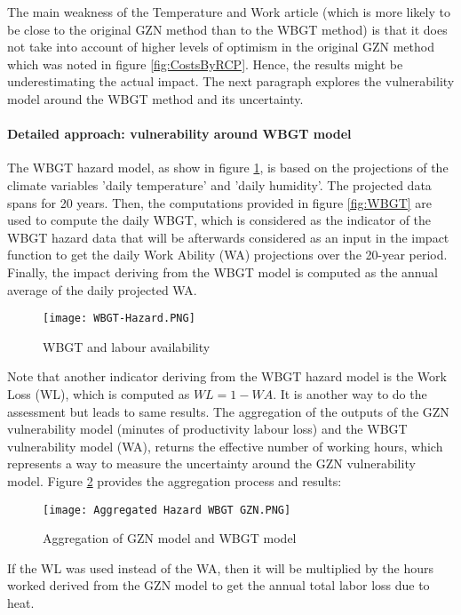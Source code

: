 \documentclass{article}
\begin{document}
The main weakness of the Temperature and Work article (which is more likely to be close to the original GZN method than to the WBGT method) is that it does not take into account of higher levels of optimism in the original GZN method which was noted in figure \ref{fig:CostsByRCP}. Hence, the results might be underestimating the actual impact. The next paragraph explores the vulnerability model around the WBGT method and its uncertainty.

\paragraph{Detailed approach: vulnerability around WBGT model}

The WBGT hazard model, as show in figure \ref{fig:WBGT-Hazard}, is based on the projections of the climate variables 'daily temperature' and 'daily humidity'. The projected data spans for 20 years. Then, the computations provided in figure \ref{fig:WBGT} are used to compute the daily WBGT, which is considered as the indicator of the WBGT hazard data that will be afterwards considered as an input in the impact function to get the daily Work Ability (WA) projections over the 20-year period. Finally, the impact deriving from the WBGT model is computed as the annual average of the daily projected WA.
\begin{figure}[h]
    \centering
    \texttt{[image: WBGT-Hazard.PNG]}
    \caption{WBGT and labour availability}
    \label{fig:WBGT-Hazard}
\end{figure}
Note that another indicator deriving from the WBGT hazard model is the Work Loss (WL), which is computed as $WL = 1 - WA$. It is another way to do the assessment but leads to same results. 
\newline
The aggregation of the outputs of the GZN vulnerability model (minutes of productivity labour loss) and the WBGT vulnerability model (WA), returns the effective number of working hours, which represents a way to measure the uncertainty around the GZN vulnerability model. Figure \ref{fig:Aggregation} provides the aggregation process and results:
\begin{figure}[h]
    \centering
    \texttt{[image: Aggregated Hazard WBGT GZN.PNG]}
    \caption{Aggregation of GZN model and WBGT model}
    \label{fig:Aggregation}
\end{figure}
If the WL was used instead of the WA, then it will be multiplied by the hours worked derived from the GZN model to get the annual total labor loss due to heat.
\end{document}
